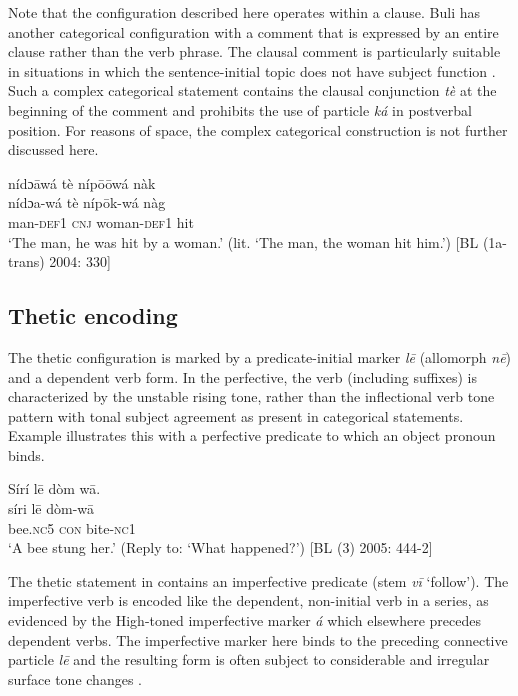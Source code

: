 \documentclass[output=paper]{langsci/langscibook}
\begin{document}
Note that the configuration described here operates within a clause. Buli has another categorical configuration with a comment that is expressed by an entire clause rather than the verb phrase. The clausal comment is particularly suitable in situations in which the sentence-initial topic does not have subject function . Such a complex categorical statement contains the clausal conjunction \textit{tè} at the beginning of the comment and prohibits the use of particle \textit{ká} in postverbal position. For reasons of space, the complex categorical construction is not further discussed here.

\ea\label{ex:schwarz:13}
\glll   nídɔ\={a}wá  tè  níp\={o}\={o}wá  nàk\\
  \textup{nídɔa-wá}  tè  níp\={o}k-wá  {nàg}\\
man-\textsc{def}1  \textsc{cnj}  woman-\textsc{def}1  hit\\
\glt ‘The man, he was hit by a woman.’ (lit. ‘The man, the woman hit him.’) [BL (1a-trans) 2004: 330]  
\z

\subsection{Thetic encoding}\label{sec:schwarz:3.3}

The thetic configuration is marked by a predicate-initial marker \textit{l\={e}} (allomorph \textit{n\={e}}) and a dependent verb form. In the perfective, the verb (including suffixes) is characterized by the unstable rising tone, rather than the inflectional verb tone pattern with tonal subject agreement as present in categorical statements. Example  illustrates this with a perfective predicate to which an object pronoun binds.

\ea\label{ex:schwarz:14}
\glll   Sírí    l\={e}  {dòm  w\={a}.}\\
    \textup{síri}    l\={e}  {dòm{-}w\={a}}\\
       bee.\textsc{nc}5  \textsc{con}  bite{-}\textsc{nc}1\\
\glt ‘A bee stung her.’ (Reply to: ‘What happened?’) [BL (3) 2005: 444-2]
\z

The thetic statement in  contains an imperfective predicate (stem \textit{v\={i}} ‘follow’). The imperfective verb is encoded like the dependent, non-initial verb in a series, as evidenced by the High-toned imperfective marker \textit{á} which elsewhere precedes dependent verbs. The imperfective marker here binds to the preceding connective particle \textit{l\={e}} and the resulting form is often subject to considerable and irregular surface tone changes \citep{Schwarz2007buli}.
\end{document}
